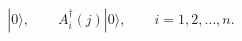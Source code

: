 \begin{equation}
|0\rangle,\qquad  A_i^{\dagger}(j) |0\rangle, \qquad i=1,2,\ldots, n. 
\label{pann}
\end{equation}

